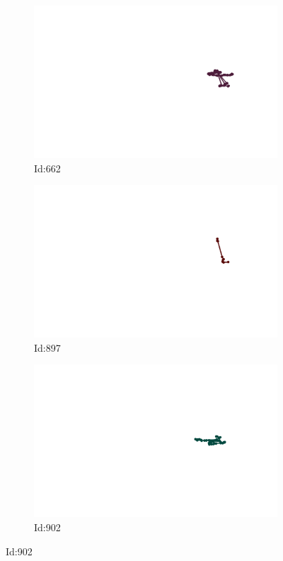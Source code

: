 \documentclass[12pt,twoside]{report}
\begin{document}
\begin{figure}
\centering
\begin{subfigure}[b]{0.20\textwidth}
\centering
\includegraphics[width=\textwidth]{../../trajectories/662.png}
\caption{Id:662}
\end{subfigure}
\begin{subfigure}[b]{0.20\textwidth}
\centering
\includegraphics[width=\textwidth]{../../trajectories/897.png}
\caption{Id:897}
\end{subfigure}
\begin{subfigure}[b]{0.20\textwidth}
\centering
\includegraphics[width=\textwidth]{../../trajectories/902.png}
\caption{Id:902}
\end{subfigure}
\end{figure}
\end{document}
